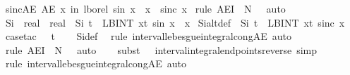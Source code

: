 \documentclass[leqno]{article}
\theoremstyle{definition}
\begin{document}
\begin{isabellebody}
\isanewline\isanewline
{}\isamarkupfalse%
\ sinc{\isacharunderscore}AE{\isacharcolon}\ {\isachardoublequoteopen}AE\ x\ in\ lborel{\isachardot}\ sin\ x\ {\isacharslash}\ x\ {\isacharequal}\ sinc\ x{\isachardoublequoteclose}\isanewline
{}\isamarkupfalse%
\ {\isacharparenleft}rule\ AE{\isacharunderscore}I\ {\isacharbrackleft}\ N\ {\isacharequal}\ {\isachardoublequoteopen}{\isacharbraceleft}{}{\isacharbraceright}{\isachardoublequoteclose}{\isacharbrackright}{\isacharcomma}\ auto{\isacharparenright}%
\isanewline\isanewline
{}\isamarkupfalse%
\ Si\ {\isacharcolon}{\isacharcolon}\ {\isachardoublequoteopen}real\ {\isasymRightarrow}\ real{\isachardoublequoteclose}\ \ {\isachardoublequoteopen}Si\ t\ {\isasymequiv}\ LBINT\ x{\isacharequal}{}{\isachardot}{\isachardot}t{\isachardot}\ sin\ x\ {\isacharslash}\ x{\isachardoublequoteclose}\isanewline
\isanewline
{}\isamarkupfalse%
\ Si{\isacharunderscore}alt{\isacharunderscore}def\ {\isacharcolon}\ {\isachardoublequoteopen}Si\ t\ {\isacharequal}\ LBINT\ x{\isacharequal}{}{\isachardot}{\isachardot}t{\isachardot}\ sinc\ x{\isachardoublequoteclose}\isanewline
{}\isamarkupfalse%
\ {\isacharparenleft}case{\isacharunderscore}tac\ {\isachardoublequoteopen}{}\ {\isasymle}\ t{\isachardoublequoteclose}{\isacharparenright}\isanewline
\ \ \isamarkupfalse%
\ Si{\isacharunderscore}def\ \isamarkupfalse%
\ {\isacharparenleft}rule\ interval{\isacharunderscore}lebesgue{\isacharunderscore}integral{\isacharunderscore}cong{\isacharunderscore}AE{\isacharcomma}\ auto{\isacharparenright}\isanewline
\ \ \isamarkupfalse%
\ {\isacharparenleft}rule\ AE{\isacharunderscore}I{\isacharprime}\ {\isacharbrackleft}\ N\ {\isacharequal}\ {\isachardoublequoteopen}{\isacharbraceleft}{}{\isacharbraceright}{\isachardoublequoteclose}{\isacharbrackright}{\isacharcomma}\ auto{\isacharparenright}\isanewline
\ \ \isamarkupfalse%
\ {\isacharparenleft}subst\ {\isacharparenleft}{}\ {}{\isacharparenright}\ interval{\isacharunderscore}integral{\isacharunderscore}endpoints{\isacharunderscore}reverse{\isacharcomma}\ simp{\isacharparenright}\isanewline
\ \ \isamarkupfalse%
\ {\isacharparenleft}rule\ interval{\isacharunderscore}lebesgue{\isacharunderscore}integral{\isacharunderscore}cong{\isacharunderscore}AE{\isacharcomma}\ auto{\isacharparenright}\isanewline
{}\isamarkupfalse%

\end{isabellebody}
\end{document}
